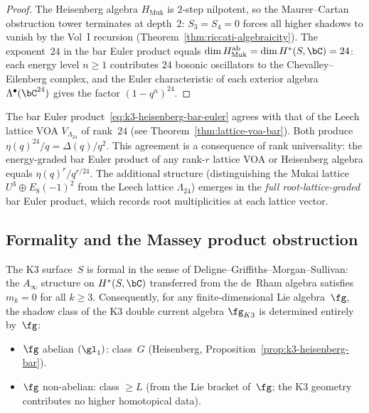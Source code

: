 \begin{proof}
The Heisenberg algebra $H_{\mathrm{Muk}}$ is $2$-step nilpotent,
so the Maurer--Cartan obstruction tower terminates at depth~$2$:
$S_3 = S_4 = 0$ forces all higher shadows to vanish by the
Vol~I recursion
(Theorem~\ref{thm:riccati-algebraicity}).
The exponent~$24$ in the bar Euler product equals
$\dim H_{\mathrm{Muk}}^{\mathrm{ab}} = \dim H^*(S, \bC) = 24$:
each energy level $n \geq 1$ contributes $24$ bosonic oscillators
to the Chevalley--Eilenberg complex, and the Euler characteristic
of each exterior algebra $\Lambda^{\bullet}(\bC^{24})$ gives
the factor $(1 - q^n)^{24}$.
\end{proof}

\begin{remark}
\label{rem:k3-heisenberg-leech}
The bar Euler product~\eqref{eq:k3-heisenberg-bar-euler} agrees with
that of the Leech lattice VOA $V_{\Lambda_{24}}$ of rank~$24$
(see Theorem~\ref{thm:lattice-voa-bar}).
Both produce $\eta(q)^{24}/q = \Delta(q)/q^2$.
This agreement is a consequence of rank universality: the
energy-graded bar Euler product of any rank-$r$ lattice VOA or
Heisenberg algebra equals $\eta(q)^r/q^{r/24}$.
The additional structure (distinguishing the Mukai lattice
$U^3 \oplus E_8(-1)^2$ from the Leech lattice $\Lambda_{24}$) emerges
in the \emph{full root-lattice-graded} bar Euler product,
which records root multiplicities at each lattice vector.
\end{remark}

\subsection{Formality and the Massey product obstruction}
\label{subsec:k3-formality-massey}

\begin{proposition}
\label{prop:k3-formality}
\ClaimStatusProvedHere
The K3 surface~$S$ is formal in the sense of
Deligne--Griffiths--Morgan--Sullivan: the $A_\infty$ structure on
$H^*(S, \bC)$ transferred from the de~Rham algebra satisfies
$m_k = 0$ for all $k \geq 3$.
Consequently, for any finite-dimensional Lie algebra~$\fg$, the
shadow class of the K3 double current algebra $\fg_{K3}$ is
determined entirely by~$\fg$:
\begin{itemize}
  \item $\fg$ abelian $(\gl_1)$: class~$G$ (Heisenberg,
    Proposition~\textup{\ref{prop:k3-heisenberg-bar}}).
  \item $\fg$ non-abelian: class $\geq L$ (from the Lie bracket
    of~$\fg$; the K3 geometry contributes no higher homotopical data).
\end{itemize}
\end{proposition}

